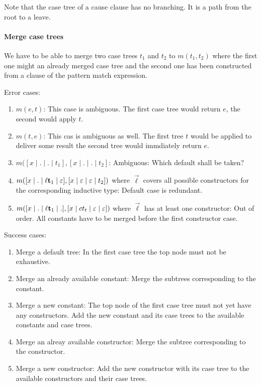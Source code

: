 Note that the case tree of a cause clause has no branching.
It is a path from the root to a leave.



\paragraph{Merge case trees} We have to be able to merge two case trees $t_1$
and $t_2$ to $m(t_1, t_2)$ where the first one might an already merged case tree
and the second one has been constructed from a clause of the pattern match
expression.

\noindent Error cases:
\begin{enumerate}
    \item $m(e, t)$: This case is ambiguous. The first case tree would return
        $e$, the second would apply $t$.

    \item $m(t, e)$: This cas is ambiguous as well. The first tree $t$ would be
        applied to deliver some result the second tree would immdiately return
        $e$.

    \item $m([x \mid . \mid . \mid t_1], [x \mid . \mid .
        \mid t_2]$: Ambiguous: Which default shall be taken?

    \item $m([x\mid . \mid {\mathbf \ell} {\mathbf t}_1 \mid \varepsilon],
        [x \mid \varepsilon \mid \varepsilon \mid t_2])$ where $\vec \ell$ covers all
        possible constructors for the corresponding inductive type: Default case
        is redundant.

    \item $m([x\mid . \mid {\mathbf \ell} {\mathbf t}_1 \mid .],
        [x \mid ct_t \mid \varepsilon \mid \varepsilon])$ where $\vec \ell$ has at least
        one constructor: Out of order. All constants have to be merged before
        the first constructor case.
\end{enumerate}

\noindent Success cases:
\begin{enumerate}
    \item Merge a default tree: In the first case tree the top node must not be
        exhaustive.

    \item Merge an already available constant: Merge the subtrees corresponding
        to the constant.

    \item Merge a new constant: The top node of the first case tree must not yet
        have any constructors. Add the new constant and its case trees to the
        available constants and case trees.

    \item Merge an alreay available constructor: Merge the subtree corresponding
        to the constructor.

    \item Merge a new constructor: Add the new constructor with its case tree to
        the available constructors and their case trees.
\end{enumerate}

